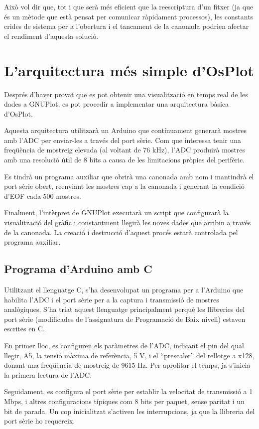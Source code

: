 \documentclass{tfgitic}[2023/06/30]
\begin{document}
Això vol dir que, tot i que serà més eficient que la reescriptura d'un
fitxer (ja que és un mètode que està pensat per comunicar ràpidament
processos), les constants crides de sistema per a l'obertura i el
tancament de la canonada podrien afectar el rendiment d'aquesta
solució.

\section{L'arquitectura més simple d'OsPlot}

Després d'haver provat que es pot obtenir una visualització en temps
real de les dades a GNUPlot, es pot procedir a implementar una
arquitectura bàsica d'OsPlot.

Aquesta arquitectura utilitzarà un Arduino que contínuament generarà
mostres amb l'ADC per enviar-les a través del port sèrie. Com que
interessa tenir una freqüència de mostreig elevada (al voltant de 76
kHz), l'ADC produirà mostres amb una resolució útil de 8 bits a causa
de les limitacions pròpies del perifèric.

Es tindrà un programa auxiliar que obrirà una canonada amb nom i
mantindrà el port sèrie obert, reenviant les mostres cap a la canonada
i generant la condició d'EOF cada 500 mostres.

Finalment, l'intèrpret de GNUPlot executarà un script que configurarà
la visualització del gràfic i constantment llegirà les noves dades que
arribin a través de la canonada. La creació i destrucció d'aquest
procés estarà controlada pel programa auxiliar.

\subsection{Programa d'Arduino amb C}

Utilitzant el llenguatge C, s'ha desenvolupat un programa per a
l'Arduino que habilita l'ADC i el port sèrie per a la captura i
transmissió de mostres analògiques. S'ha triat aquest llenguatge
principalment perquè les llibreries del port sèrie (modificades de
l'assignatura de Programació de Baix nivell) estaven escrites en C.

En primer lloc, es configuren els paràmetres de l'ADC, indicant el pin
del qual llegir, A5, la tensió màxima de referència, 5 V, i el
``prescaler'' del rellotge a x128, donant una freqüència de mostreig
de 9615 Hz. Per aprofitar el temps, ja s'inicia la primera lectura de
l'ADC.

Seguidament, es configura el port sèrie per establir la velocitat de
transmissió a 1 Mbps, i altres configuracions típiques com 8 bits per
paquet, sense paritat i un bit de parada. Un cop inicialitzat
s'activen les interrupcions, ja que la llibreria del port sèrie ho
requereix.
\end{document}
